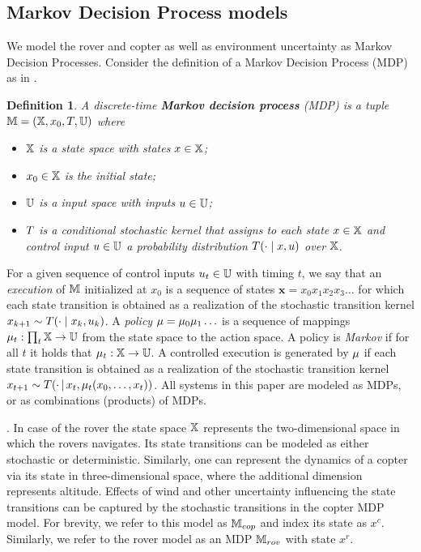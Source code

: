 \documentclass[conference]{IEEEtran}
\renewcommand{\cite}[1]{\citep{#1}}
\newtheorem{definition}{Definition}
\begin{document}
\subsection{Markov Decision Process models}
We model the rover and copter as well as environment uncertainty as Markov Decision Processes. Consider the definition of a Markov Decision Process (MDP) as in \cite{Bertsekas1978}.
\begin{definition}
\label{def:MDP}
  A discrete-time \textbf{Markov decision process} (MDP) is a tuple $\mathbb{M} = (\mathbb{X}, x_0,T, \mathbb{U})$ where
  \begin{itemize}
    \item $\mathbb{X}$ is a state space with states $x\in\mathbb{X}$; %
    \item $x_0\in \mathbb{X}$ is the initial state;
    \item $\mathbb{U}$ is a input space with inputs $u\in\mathbb{U}$;
    \item $T$ is a conditional stochastic kernel that assigns to each state $x\in \mathbb{X}$ and control input $u\in \mathbb{U}$ a probability distribution $T(\cdot\mid x,u)$ over $\mathbb{X}$.
  \end{itemize}
\end{definition}
For a given sequence of control inputs $u_t \in \mathbb{U}$ with timing $t$, we say that an \emph{execution} of $\mathbb{M}$ initialized at $x_0$ is a sequence of states $\mathbf x = x_0x_1x_2x_3\ldots $ for which each state transition is obtained as a realization of the stochastic transition kernel $x_{k+1} \sim T(\cdot \mid x_k, u_k)$.
A \emph{policy} $\mu = \mu_0 \mu_1 \ldots$ is a sequence of mappings $\mu_t:\prod_{t}\mathbb{X}\rightarrow \mathbb{U}$ from the state space to the action space.  A policy is \emph{Markov}  if for all $t$ it holds that  $\mu_t:\mathbb{X}\rightarrow \mathbb{U}$. A controlled execution is generated by $\mu$ if each state transition is obtained as a realization of the stochastic transition kernel $x_{t+1} \sim T(\cdot\,{ \mid}\, x_t, \mu_t(x_0,\ldots,x_t))$. All systems in this paper are modeled as MDPs, or as combinations (products) of MDPs.

\smallskip
{}.
In case of the rover the state space $\mathbb{X}$ represents the two-dimensional space in which the rovers navigates. Its state transitions can be modeled as either stochastic or deterministic. Similarly, one can represent the dynamics of a copter via its state in three-dimensional space, where the additional dimension represents altitude. Effects of wind and other uncertainty influencing the state transitions can be captured by the stochastic transitions in the copter MDP model. For brevity, we refer to this model as $\mathbb{M}_{cop}$ and index its state as $x^c$. Similarly, we refer to the rover model as an MDP $\mathbb{M}_{rov}$ with state $x^r$.
\end{document}
